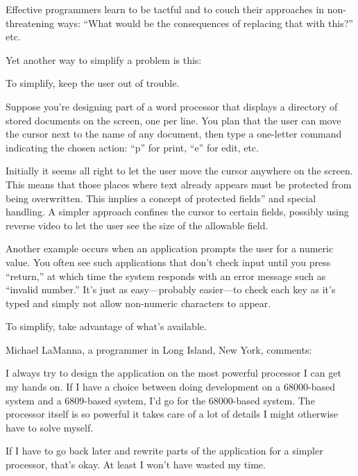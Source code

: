 \noindent Effective programmers learn to be tactful and to couch their
approaches in non-threatening ways: ``What would be the consequences
of replacing that with this?'' etc.

Yet another way to simplify a problem is this:

\begin{tip}
To simplify, keep the user out of trouble.
\end{tip}
Suppose you're designing part of a word processor that displays a
directory of stored documents on the screen, one per line. You plan
that the
user can move the cursor next to the name of any document, then type a
one-letter command indicating the chosen action: ``p'' for print,
``e'' for edit, etc.

Initially it seems all right to let the user move the cursor anywhere
on the screen. This means that those places where text already appears
must be protected from being overwritten. This implies a concept of
protected fields'' and special handling. A simpler approach confines
the cursor to certain fields, possibly using reverse video to let the
user see the size of the allowable field.

Another example occurs when an application prompts the user for a
numeric value. You often see such applications that don't check input
until you press ``return,'' at which time the system responds with an
error message such as ``invalid number.'' It's just as easy---probably
easier---to check each key as it's typed and simply not allow
non-numeric characters to appear.

\begin{tip}
To simplify, take advantage of what's available.
\end{tip}

\begin{interview}
Michael LaManna, a \Forth{} programmer in Long Island, New York,
comments:

\begin{tfquot}
I always try to design the application on the most powerful processor
I can get my hands on. If I have a choice between doing development on
a 68000-based system and a 6809-based system, I'd go for the
68000-based system. The processor itself is so powerful it takes care
of a lot of details I might otherwise have to solve myself.

If I have to go back later and rewrite parts of the application for a
simpler processor, that's okay. At least I won't have wasted my time.
\end{tfquot}
\end{interview}

